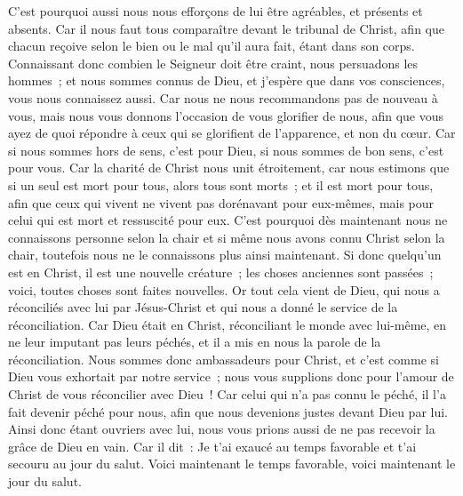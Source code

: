 \begin{multicols}{2}
C'est pourquoi aussi nous nous efforçons de lui être agréables, et présents et absents.
Car il nous faut tous comparaître devant le tribunal de Christ, afin que chacun reçoive selon le bien ou le mal qu'il aura fait, étant dans son corps.
Connaissant donc combien le Seigneur doit être craint, nous persuadons les hommes~; et nous sommes connus de Dieu, et j'espère que dans vos consciences, vous nous connaissez aussi.
Car nous ne nous recommandons pas de nouveau à vous, mais nous vous donnons l'occasion de vous glorifier de nous, afin que vous ayez de quoi répondre à ceux qui se glorifient de l'apparence, et non du cœur.
Car si nous sommes hors de sens, c'est pour Dieu, si nous sommes de bon sens, c'est pour vous.
Car la charité de Christ nous unit étroitement, car nous estimons que si un seul est mort pour tous, alors tous sont morts~;
et il est mort pour tous, afin que ceux qui vivent ne vivent pas dorénavant pour eux-mêmes, mais pour celui qui est mort et ressuscité pour eux.
C'est pourquoi dès maintenant nous ne connaissons personne selon la chair et si même nous avons connu Christ selon la chair, toutefois nous ne le connaissons plus ainsi maintenant.
Si donc quelqu'un est en Christ, il est une nouvelle créature~; les choses anciennes sont passées~; voici, toutes choses sont faites nouvelles.
Or tout cela vient de Dieu, qui nous a réconciliés avec lui par Jésus-Christ et qui nous a donné le service de la réconciliation.
Car Dieu était en Christ, réconciliant le monde avec lui-même, en ne leur imputant pas leurs péchés, et il a mis en nous la parole de la réconciliation.
Nous sommes donc ambassadeurs pour Christ, et c'est comme si Dieu vous exhortait par notre service~; nous vous supplions donc pour l'amour de Christ de vous réconcilier avec Dieu~!
Car celui qui n'a pas connu le péché, il l'a fait devenir péché pour nous, afin que nous devenions justes devant Dieu par lui.
\VerseOne{}Ainsi donc étant ouvriers avec lui, nous vous prions aussi de ne pas recevoir la grâce de Dieu en vain.
Car il dit~: Je t'ai exaucé au temps favorable et t'ai secouru au jour du salut. Voici maintenant le temps favorable, voici maintenant le jour du salut.

\end{multicols}
